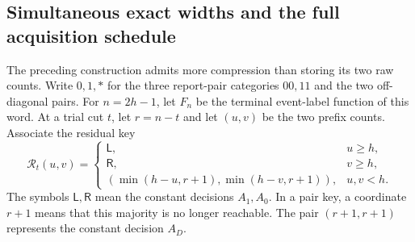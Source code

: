 \subsection{Simultaneous exact widths and the full acquisition schedule}
The preceding construction admits more compression than storing its two
raw counts. Write $0,1,*$ for the three report-pair categories $00,11$
and the two off-diagonal pairs. For $n=2h-1$, let $F_n$ be the terminal
event-label function of this word. At a trial cut $t$, let $r=n-t$ and
let $(u,v)$ be the two prefix counts. Associate the residual key
\begin{equation}\label{eq:v20-key}
 \mathcal R_t(u,v)=
 \begin{cases}
  \mathsf L,&u\ge h,\\
  \mathsf R,&v\ge h,\\
  (\min(h-u,r+1),\min(h-v,r+1)),&u,v<h.
 \end{cases}
\end{equation}
The symbols $\mathsf L,\mathsf R$ mean the constant decisions $A_1,A_0$.
In a pair key, a coordinate $r+1$ means that this majority is no longer
reachable. The pair $(r+1,r+1)$ represents the constant decision $A_D$.

